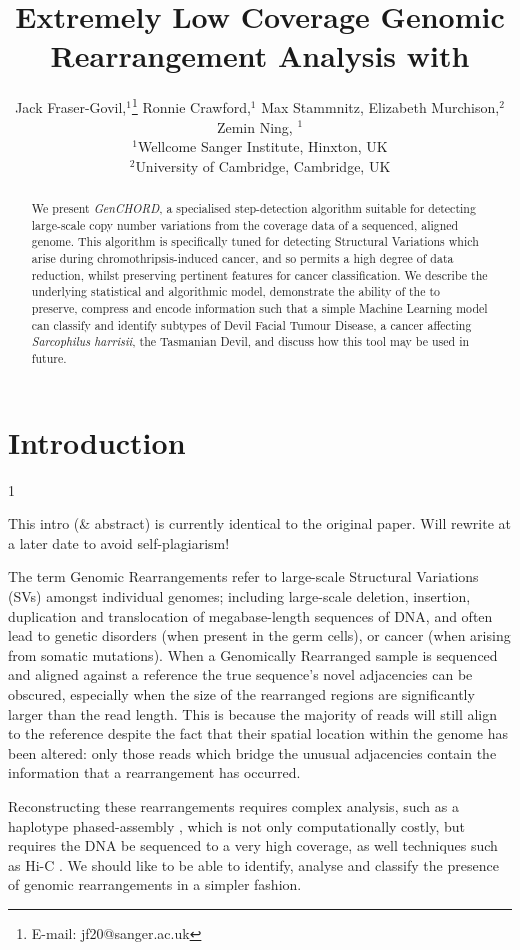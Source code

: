\documentclass[fleqn,usenatbib]{mnras}
\title[GenCHORD]{Extremely Low Coverage Genomic Rearrangement Analysis with \codename{}}
\author[Fraser-Govil et. al.]{
Jack Fraser-Govil,$^{1}$\thanks{E-mail: jf20@sanger.ac.uk}
Ronnie Crawford,$^{1}$
Max Stammnitz,
Elizabeth Murchison,$^{2}$
Zemin Ning, $^{1}$
\\
$^{1}$Wellcome Sanger Institute, Hinxton, UK\\
$^{2}$University of Cambridge, Cambridge, UK\\
}
\def\commentVisible{1}
\newcommand\comment[1]
{
	{
		\if\commentVisible1
			\color{red!70!black}
		\else
			\color{black}
		\fi

		#1
	}
}
\def\codename{\textit{GenCHORD}}
\begin{document}
\label{firstpage}
\pagerange{\pageref{firstpage}--\pageref{lastpage}}
\maketitle

	
	\begin{abstract}
		We present \codename{}, a specialised step-detection algorithm suitable for detecting large-scale copy number variations from the coverage data of a sequenced, aligned genome. This algorithm is specifically tuned for detecting Structural Variations which arise during chromothripsis-induced cancer, and so permits a high degree of data reduction, whilst preserving pertinent features for cancer classification. We describe the underlying statistical and algorithmic model, demonstrate the ability of the to preserve, compress and encode information such that a simple Machine Learning model can classify and identify subtypes of Devil Facial Tumour Disease, a cancer affecting \textit{Sarcophilus harrisii}, the Tasmanian Devil, and discuss how this tool may be used in future.   
	\end{abstract}

	\section{Introduction}
		\comment{This intro (\& abstract) is currently identical to the original paper. Will rewrite at a later date to avoid self-plagiarism!}

		{The term} Genomic Rearrangements refer to large-scale Structural Variations (SVs) amongst individual genomes; including large-scale deletion, insertion, duplication and translocation of megabase-length sequences of DNA,  and often lead to genetic disorders (when present in the germ cells), or cancer (when arising from somatic mutations). When a Genomically Rearranged sample is sequenced and aligned against a reference the true sequence's novel adjacencies can be obscured, especially when the size of the rearranged regions are significantly larger than the read length. This is because the majority of  reads will still align to the reference despite the fact that their spatial location within the genome has been altered: only those reads which bridge the unusual adjacencies contain the information that a rearrangement has occurred.

		Reconstructing these rearrangements requires complex analysis, such as a haplotype phased-assembly , which is not only computationally costly, but requires the DNA be sequenced to a very high coverage, as well techniques such as Hi-C \citep{Ijaz2024}. We should like to be able to identify, analyse and classify the presence of genomic rearrangements in a simpler fashion.  
\end{document}
